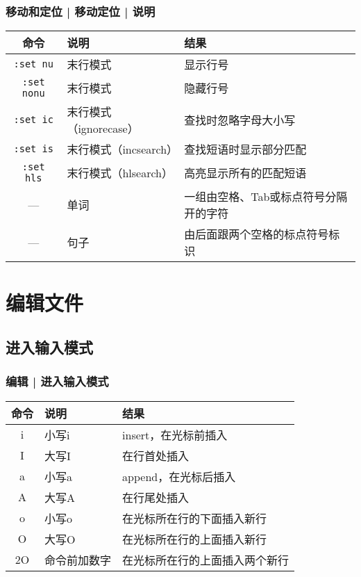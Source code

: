 \begin{frame}[fragile]
  \frametitle{移动和定位 | 移动定位 | 说明}
  \begin{table}
    \centering
    \begin{tabularx}{\textwidth}{clX}
      \hline
      \rowcolor{blue!50}命令 & 说明 & 结果\\
      \hline
      \verb|:set nu| & 末行模式 & 显示行号\\
      \verb|:set nonu| & 末行模式 & 隐藏行号\\
      \verb|:set ic| & 末行模式（ignorecase） & 查找时忽略字母大小写\\
      \verb|:set is| & 末行模式（incsearch） & 查找短语时显示部分匹配\\
      \verb|:set hls| & 末行模式（hlsearch） & 高亮显示所有的匹配短语\\
      \hline
      --- & 单词 & 一组由空格、Tab或标点符号分隔开的字符\\
      --- & 句子 & 由后面跟两个空格的标点符号标识\\
      \hline
    \end{tabularx}
  \end{table}
\end{frame}

\section{编辑文件}
\subsection{进入输入模式}
\begin{frame}
  \frametitle{编辑 | \alert{进入输入模式}}
  \begin{table}
    \centering
    \begin{tabularx}{0.9\textwidth}{clX}
      \hline
      \rowcolor{blue!50}命令 & 说明 & 结果\\
      \hline
      i & 小写i & insert，在光标前插入\\
      I & 大写I & 在行首处插入\\
      a & 小写a & append，在光标后插入\\
      A & 大写A & 在行尾处插入\\
      o & 小写o & 在光标所在行的下面插入新行\\
      O & 大写O & 在光标所在行的上面插入新行\\
      \hline
      2O & 命令前加数字 & 在光标所在行的上面插入两个新行\\
      \hline
    \end{tabularx}
  \end{table}
\end{frame}


